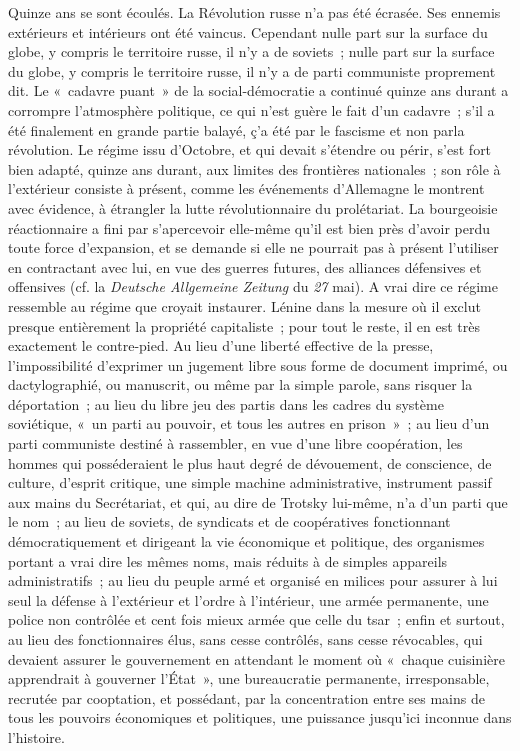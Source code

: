 \documentclass[french,twoside]{book} %
\begin{document}
Quinze ans se sont écoulés. La Révolution russe n'a pas été écrasée. Ses ennemis extérieurs et intérieurs ont été vaincus. Cependant nulle part sur la surface du globe, y compris le territoire russe, il n'y a de soviets ; nulle part sur la surface du globe, y compris le territoire russe, il n'y a de parti communiste proprement dit. Le « cadavre puant » de la social-démocratie a continué quinze ans durant a corrompre l'atmosphère politique, ce qui n'est guère le fait d'un cadavre ; s'il a été finalement en grande partie balayé, ç'a été par le fascisme et non parla révolution. Le régime issu d'Octobre, et qui devait s'étendre ou périr, s'est fort bien adapté, quinze ans durant, aux limites des frontières nationales ; son rôle à l'extérieur consiste à présent, comme les événements d'Allemagne le montrent avec évidence, à étrangler la lutte révolutionnaire du prolétariat. La bourgeoisie réactionnaire a fini par s'apercevoir elle-même qu'il est bien près d'avoir perdu toute force d'expansion, et se demande si elle ne pourrait pas à présent l'utiliser en contractant avec lui, en vue des guerres futures, des alliances défensives et offensives (cf. la {\itshape Deutsche Allgemeine Zeitung} du {\itshape 27} mai). A vrai dire ce régime ressemble au régime que croyait instaurer. Lénine dans la mesure où il exclut presque entièrement la propriété capitaliste ; pour tout le reste, il en est très exactement le contre-pied. Au lieu d'une liberté effective de la presse, l'impossibilité d'exprimer un jugement libre sous forme de document imprimé, ou dactylographié, ou manuscrit, ou même par la simple parole, sans risquer la déportation ; au lieu du libre jeu des partis dans les cadres du système soviétique, « un parti au pouvoir, et tous les autres en prison » ; au lieu d'un parti communiste destiné à rassembler, en vue d'une libre coopération, les hommes qui posséderaient le plus haut degré de dévouement, de conscience, de culture, d'esprit critique, une simple machine administrative, instrument passif aux mains du Secrétariat, et qui, au dire de Trotsky lui-même, n'a d'un parti que le nom ; au lieu de soviets, de syndicats et de coopératives fonctionnant démocratiquement et dirigeant la vie économique et politique, des organismes portant a vrai dire les mêmes noms, mais réduits à de simples appareils administratifs ; au lieu du peuple armé et organisé en milices pour assurer à lui seul la défense à l'extérieur et l'ordre à l'intérieur, une armée permanente, une police non contrôlée et cent fois mieux armée que celle du tsar ; enfin et surtout, au lieu des fonctionnaires élus, sans cesse contrôlés, sans cesse révocables, qui devaient assurer le gouvernement en attendant le moment où « chaque cuisinière apprendrait à gouverner l'État », une bureaucratie permanente, irresponsable, recrutée par cooptation, et possédant, par la concentration entre ses mains de tous les pouvoirs économiques et politiques, une puissance jusqu'ici inconnue dans l'histoire.\par
\end{document}
